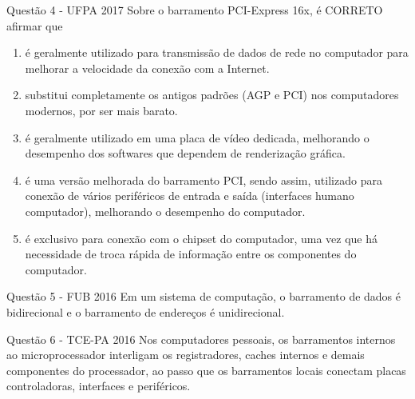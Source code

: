 \documentclass[aspectratio=169,
				xcolor=table]{beamer}
\begin{document}
	
	\begin{frame}{Questão 4 - UFPA 2017}
		Sobre o barramento PCI-Express 16x, é CORRETO afirmar que 
	
		\begin{enumerate}
			\item é geralmente utilizado para transmissão de dados de rede no computador para melhorar a velocidade da conexão com a Internet.  
	  
			\item substitui completamente os antigos padrões (AGP e PCI) nos computadores modernos, por ser mais barato. 
	  
			\item é geralmente utilizado em uma placa de vídeo dedicada, melhorando o desempenho dos softwares que dependem de renderização gráfica. 
	  
			\item é uma versão melhorada do barramento PCI, sendo assim, utilizado para conexão de vários periféricos de entrada e saída (interfaces humano computador), melhorando o desempenho do computador. 
	  
			\item é exclusivo para conexão com o chipset do computador, uma vez que há necessidade de troca rápida de informação entre os componentes do computador. 
		
		\end{enumerate}

	\end{frame}
	
	\begin{frame}{Questão 5 - FUB 2016}
		Em um sistema de computação, o barramento de dados é bidirecional e o barramento de endereços é unidirecional.

	\end{frame}
	
	\begin{frame}{Questão 6 - TCE-PA 2016}
		Nos computadores pessoais, os barramentos internos ao microprocessador interligam os registradores, caches internos e demais componentes do processador, ao passo que os barramentos locais conectam placas controladoras, interfaces e periféricos.

	\end{frame}
	
\end{document}

